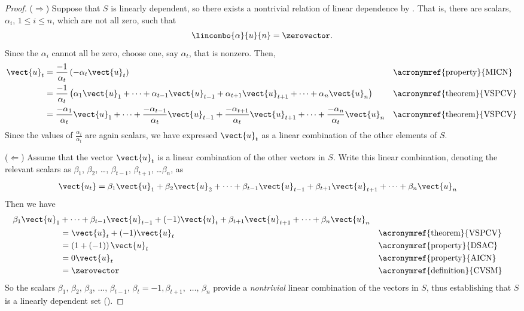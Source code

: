 \begin{proof}
($\Rightarrow$) Suppose that $S$ is linearly dependent, so there exists a nontrivial relation of linear dependence by .  That is, there are scalars, $\alpha_i$, $1\leq i\leq n$, which are not all zero, such that
%
\begin{equation*}
\lincombo{\alpha}{u}{n}=\zerovector.
\end{equation*}
%
Since the $\alpha_i$ cannot all be zero, choose one, say $\alpha_t$, that is nonzero.  Then,
%
\begin{align*}
\vect{u}_t
&=\frac{-1}{\alpha_t}\left(-\alpha_t\vect{u}_t\right)&&\text{\acronymref{property}{MICN}}\\
%
&=
\frac{-1}{\alpha_t}\left(
\alpha_1\vect{u}_1+
\cdots+
\alpha_{t-1}\vect{u}_{t-1}+
\alpha_{t+1}\vect{u}_{t+1}+
\cdots+
\alpha_n\vect{u}_n
\right)&&\text{\acronymref{theorem}{VSPCV}}\\
%
&=
\frac{-\alpha_1}{\alpha_t}\vect{u}_1+
\cdots+
\frac{-\alpha_{t-1}}{\alpha_t}\vect{u}_{t-1}+
\frac{-\alpha_{t+1}}{\alpha_t}\vect{u}_{t+1}+
\cdots+
\frac{-\alpha_n}{\alpha_t}\vect{u}_n
&&\text{\acronymref{theorem}{VSPCV}}
\end{align*}
%
Since the values of $\frac{\alpha_i}{\alpha_t}$ are again scalars, we have expressed $\vect{u}_t$ as a linear combination of the other elements of $S$.\par
%
($\Leftarrow$) Assume that the vector $\vect{u}_t$ is a linear combination of the other vectors in $S$.  Write this linear combination,  denoting the relevant scalars as $\beta_1$, $\beta_2$, \dots, $\beta_{t-1}$, $\beta_{t+1}$, \dots $\beta_n$, as
%
\begin{align*}
\vect{u_t}
&=
\beta_1\vect{u}_1+
\beta_2\vect{u}_2+
\cdots+
\beta_{t-1}\vect{u}_{t-1}+
\beta_{t+1}\vect{u}_{t+1}+
\cdots+
\beta_n\vect{u}_n
\end{align*}
Then we have
%
\begin{align*}
\beta_1\vect{u}_1
&+\cdots+
\beta_{t-1}\vect{u}_{t-1}+
(-1)\vect{u}_t+
\beta_{t+1}\vect{u}_{t+1}+
\cdots+
\beta_n\vect{u}_n\\
&=\vect{u}_t+(-1)\vect{u}_t&&\text{\acronymref{theorem}{VSPCV}}\\
&=\left(1+\left(-1\right)\right)\vect{u}_t&&\text{\acronymref{property}{DSAC}}\\
&=0\vect{u}_t&&\text{\acronymref{property}{AICN}}\\
&=\zerovector&&\text{\acronymref{definition}{CVSM}}
\end{align*}
%
So the scalars $\beta_1,\,\beta_2,\,\beta_3,\,\ldots,\,\beta_{t-1},\,\beta_t=-1,\beta_{t+1},\,\,\ldots,\,\beta_n$ provide a {\em nontrivial} linear combination of the vectors in $S$, thus establishing that $S$ is a linearly dependent set ().
\end{proof}
